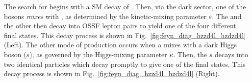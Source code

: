 The search for \PZD begins with a SM decay of \htozznostar.
Then, via the dark sector, one of the \PZ bosons \emph{mixes} with \PZD, as determined by the kinetic-mixing parameter $\varepsilon$.
The \PZD and the other \PZ then decay into OSSF lepton pairs to yield one of the four different \fourl final states.
This decay process is shown in Fig.~\ref{fig:feyn_diag_hzzd4l_hzdzd4l} (Left).
The other mode of \PZD production occurs when a \PH mixes with a dark Higgs boson ($s$), as governed by the Higgs-mixing parameter $\kappa$.  %
Then, the $s$ decays into two identical \PZD particles which decay promptly to give one of the \fourl final states.
This decay process is shown in Fig.~\ref{fig:feyn_diag_hzzd4l_hzdzd4l} (Right).
